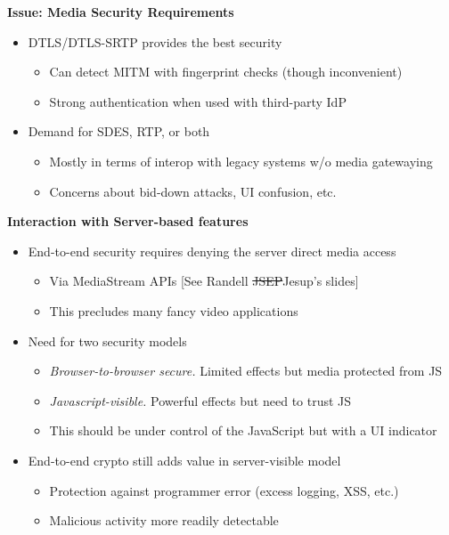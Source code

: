\documentclass[helvetica]{seminar}
\newcommand{\heading}[1]{%
  \begin{center} 
    \large\bf 
    #1 
  \end{center} 
  \vspace{.4 in}}
\begin{document}
\begin{slide}
\heading{Issue: Media Security Requirements}

\begin{itemize}
\item DTLS/DTLS-SRTP provides the best security
  \begin{itemize}
  \item Can detect MITM with fingerprint checks (though inconvenient)
  \item Strong authentication when used with third-party IdP
  \end{itemize}

\item Demand for SDES, RTP, or both
  \begin{itemize}
  \item Mostly in terms of interop with legacy systems w/o media gatewaying
  \item Concerns about bid-down attacks, UI confusion, etc.
  \end{itemize}
\end{itemize}
\end{slide}



\begin{slide}
\heading{Interaction with Server-based features}

\vspace{-.4in}
\begin{itemize}
\item End-to-end security requires denying the server direct media access
  \begin{itemize}
  \item Via MediaStream APIs [See Randell \sout{JSEP}Jesup's slides]
  \item This precludes many fancy video applications
  \end{itemize}

\item Need for two security models
  \begin{itemize}
  \item[] \emph{Browser-to-browser secure.} Limited effects but media protected from JS
  \item[] \emph{Javascript-visible.} Powerful effects but need to trust JS
  \item This should be under control of the JavaScript but with a UI indicator
  \end{itemize}

\item End-to-end crypto still adds value in server-visible model
  \begin{itemize}
  \item Protection against programmer error (excess logging, XSS, etc.)
  \item Malicious activity more readily detectable
  \end{itemize}

\end{itemize}
\end{slide}
\end{document}
